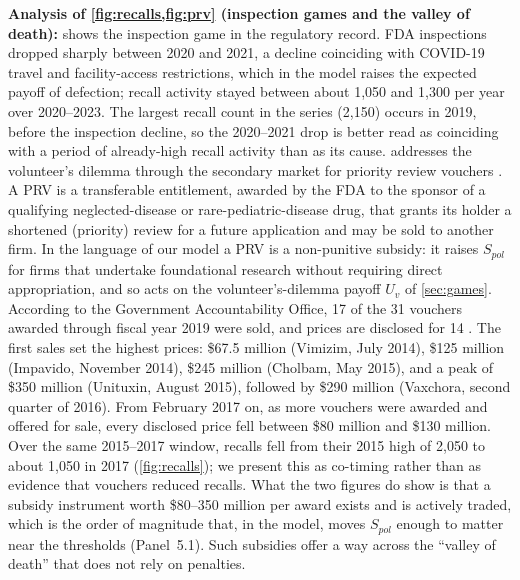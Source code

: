 \documentclass[10pt]{article}
\begin{document}
\textbf{Analysis of \cref{fig:recalls,fig:prv} (inspection games and the valley of death):} \textbf{} shows the inspection game in the regulatory record. FDA inspections dropped sharply between 2020 and 2021, a decline coinciding with COVID-19 travel and facility-access restrictions, which in the model raises the expected payoff of defection; recall activity stayed between about 1,050 and 1,300 per year over 2020--2023. The largest recall count in the series (2,150) occurs in 2019, before the inspection decline, so the 2020--2021 drop is better read as coinciding with a period of already-high recall activity than as its cause. \textbf{} addresses the volunteer's dilemma through the secondary market for priority review vouchers \cite{ridley2006}. A PRV is a transferable entitlement, awarded by the FDA to the sponsor of a qualifying neglected-disease or rare-pediatric-disease drug, that grants its holder a shortened (priority) review for a future application and may be sold to another firm. In the language of our model a PRV is a non-punitive subsidy: it raises $S_{pol}$ for firms that undertake foundational research without requiring direct appropriation, and so acts on the volunteer's-dilemma payoff $U_v$ of \cref{sec:games}. According to the Government Accountability Office, 17 of the 31 vouchers awarded through fiscal year 2019 were sold, and prices are disclosed for 14 \cite{gao2020}. The first sales set the highest prices: \$67.5 million (Vimizim, July 2014), \$125 million (Impavido, November 2014), \$245 million (Cholbam, May 2015), and a peak of \$350 million (Unituxin, August 2015), followed by \$290 million (Vaxchora, second quarter of 2016). From February 2017 on, as more vouchers were awarded and offered for sale, every disclosed price fell between \$80 million and \$130 million. Over the same 2015--2017 window, recalls fell from their 2015 high of 2,050 to about 1,050 in 2017 (\cref{fig:recalls}); we present this as co-timing rather than as evidence that vouchers reduced recalls. What the two figures do show is that a subsidy instrument worth \$80--350 million per award exists and is actively traded, which is the order of magnitude that, in the model, moves $S_{pol}$ enough to matter near the thresholds (Panel~5.1). Such subsidies offer a way across the ``valley of death'' that does not rely on penalties.
\end{document}
